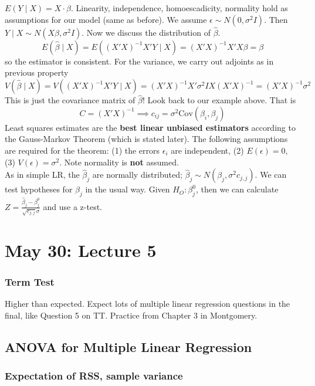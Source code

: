 \documentclass[12pt, a4paper]{article}
\theoremstyle{definition}
\newcommand{\imp}{\implies}
\newcommand{\eps}{\epsilon}
\newcommand{\f}{\frac}
\newcommand{\Cov}{\mathrm{Cov}}
\begin{document}
		$E(Y \mid X) = X \cdot \beta$. Linearity, independence, homoescadicity, normality hold as assumptions for our model (same as before). We assume $\eps \sim N(0, \sigma^2 I)$. Then $Y \mid X \sim N(X \beta , \sigma^2 I)$. Now we discuss the distribution of $\hat\beta$.
		$$
			E(\hat \beta \mid X) = E((X'X)^{-1}X'Y \mid X) = (X'X)^{-1}X'X\beta = \beta
		$$
		so the estimator is consistent. For the variance, we carry out adjoints as in previous property
		$$
			V(\hat \beta \mid X) 
			= V((X'X)^{-1}X'Y \mid X) 
			= (X'X)^{-1}X' \sigma^2 I X (X'X)^{-1}
			= (X'X)^{-1} \sigma^2
		$$
		This is just the covariance matrix of $\hat \beta$! Look back to our example above. That is 
			$$C = (X'X)^{-1} \imp c_{ij} = \sigma^2 \Cov(\beta_i, \beta_j)$$
		Least squares estimates are the {\bf best linear unbiased estimators} according to the Gauss-Markov Theorem (which is stated later). The following assumptions are required for the theorem: (1) the errors $\eps_i$ are independent, (2) $E(\eps) = 0$, (3) $V(\eps) = \sigma^2$. Note normality is {\bf not} assumed. \\
		
		As in simple LR, the $\hat \beta_j$ are normally distributed; $\hat \beta_j \sim N(\beta_j, \sigma^2 c_{j,j})$. We can test hypotheses for $\beta_j$ in the usual way. Given $H_O : \beta_j^0$, then we can calculate $Z = \f{\hat\beta_j - \beta_j^0}{\sqrt{c_{j,j}} \sigma }$ and use a z-test. 		
		
		
		
	\section{May 30: Lecture 5}
	
		\subsubsection{Term Test}
		
		Higher than expected. Expect lots of multiple linear regression questions in the final, like Question 5 on TT. Practice from Chapter 3 in Montgomery.
		
		\subsection{ANOVA for Multiple Linear Regression}
		
		\subsubsection{Expectation of RSS, sample variance}
		
\end{document}
